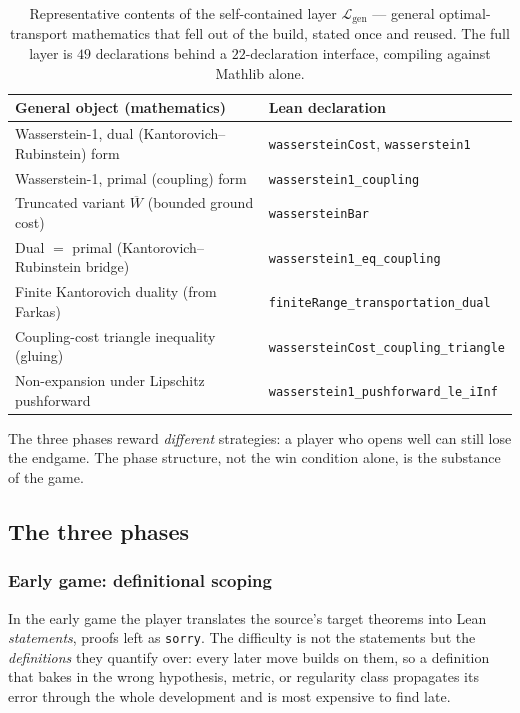 \documentclass[11pt]{article}
\theoremstyle{plain}
\theoremstyle{definition}
\theoremstyle{remark}
\newcommand{\Wbar}{\overline{W}}
\newcommand{\lean}[1]{\texttt{#1}}
\begin{document}
\begin{table}[t]
\centering
\begin{tabular}{ll}
\hline
General object (mathematics) & Lean declaration \\
\hline
Wasserstein-1, dual (Kantorovich--Rubinstein) form & \lean{wassersteinCost}, \lean{wasserstein1} \\
Wasserstein-1, primal (coupling) form & \lean{wasserstein1\_coupling} \\
Truncated variant $\Wbar$ (bounded ground cost) & \lean{wassersteinBar} \\
Dual $=$ primal (Kantorovich--Rubinstein bridge) & \lean{wasserstein1\_eq\_coupling} \\
Finite Kantorovich duality (from Farkas) & \lean{finiteRange\_transportation\_dual} \\
Coupling-cost triangle inequality (gluing) & \lean{wassersteinCost\_coupling\_triangle} \\
Non-expansion under Lipschitz pushforward & \lean{wasserstein1\_pushforward\_le\_iInf} \\
\hline
\end{tabular}
\caption{Representative contents of the self-contained layer
$\mathcal{L}_{\mathrm{gen}}$ --- general optimal-transport mathematics that
fell out of the build, stated once and reused. The full layer is $49$
declarations behind a $22$-declaration interface, compiling against Mathlib alone.}
\label{tab:lgen}
\end{table}

\medskip
The three phases reward \emph{different} strategies: a player who opens well can still
lose the endgame. The phase structure, not the win condition alone, is the substance of
the game.

\subsection{The three phases}\label{sec:phases}

\subsubsection{Early game: definitional scoping}
In the early game the player translates the source's target theorems into Lean
\emph{statements}, proofs left as \lean{sorry}. The difficulty is not the
statements but the \emph{definitions} they quantify over: every later move builds
on them, so a definition that bakes in the wrong hypothesis, metric, or regularity
class propagates its error through the whole development and is most expensive to
find late.
\end{document}
